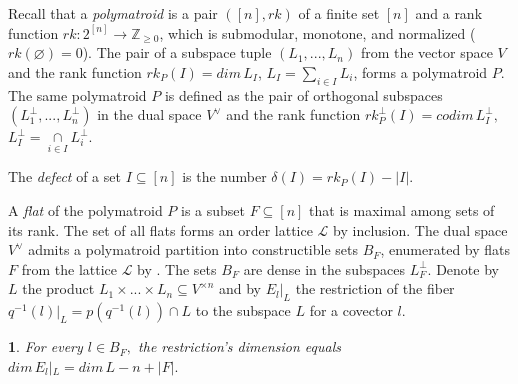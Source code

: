 \documentclass[11pt]{article}
\theoremstyle{plain}
\theoremstyle{definition}
\theoremstyle{remark}
\theoremstyle{plain}
\newtheorem{lem}[thm]{\protect\lemmaname}
\theoremstyle{plain}
\theoremstyle{plain}
\theoremstyle{definition}
\providecommand{\lemmaname}{Lemma}
\begin{document}
Recall that a \textit{polymatroid} is a pair $([n],rk)$ of a finite
set $[n]$ and a rank function $rk:2^{[n]}\rightarrow\mathbb{Z}_{\geq0}$,
which is submodular, monotone, and normalized ($rk(\varnothing)=0$).
The pair of a subspace tuple $(L_{1},...,L_{n})$ from the vector
space $V$ and the rank function $rk_{P}(I)=dim\,L_{I}$, $L_{I}=\underset{i\in I}{\sum}L_{i}$,
forms a polymatroid $P$. The same polymatroid $P$ is defined as
the pair of orthogonal subspaces $(L_{1}^{\perp},...,L_{n}^{\perp})$
in the dual space $V^{\vee}$ and the rank function $rk_{P}^{\perp}(I)=codim\,L_{I}^{\perp},$
$L_{I}^{\perp}=\underset{i\in I}{\cap}L_{i}^{\perp}$. 

The\textit{ defect} of a set $I\subseteq[n]$ is the number $\delta(I)=rk_{P}(I)-|I|$.

A \textit{flat} of the polymatroid $P$ is a subset $F\subseteq[n]$
that is maximal among sets of its rank. The set of all flats forms
an order lattice $\mathcal{L}$ by inclusion. The dual space $V^{\vee}$
admits a polymatroid partition into constructible sets $B_{F}$, enumerated
by flats $F$ from the lattice $\mathcal{L}$ by \cite{pokidkin_combinatorics_2025}.
The sets $B_{F}$ are dense in the subspaces $L_{F}^{\perp}$. Denote
by $L$ the product $L_{1}\times...\times L_{n}\subseteq V^{\times n}$
and by $E_{l}|_{L}$ the restriction of the fiber $q^{-1}(l)|_{L}=p(q^{-1}(l))\cap L$
to the subspace $L$ for a covector $l$.
\begin{lem}
\label{Lemma. Dimension of a fiber}For every $l\in B_{F},$ the restriction's
dimension equals $dim\,E_{l}|_{L}=dim\,L-n+|F|.$
\end{lem}
\end{document}
